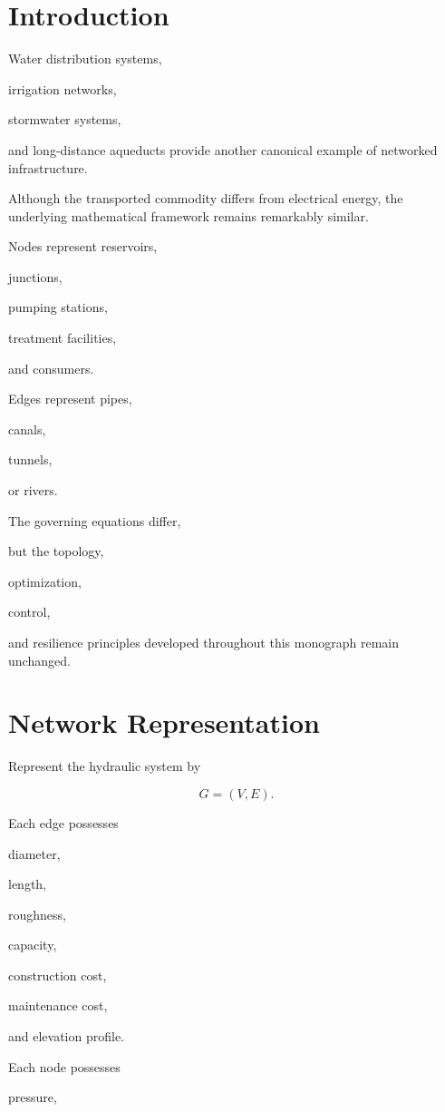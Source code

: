 \documentclass[11pt,fleqn]{book}
\numberwithin{equation}{chapter}
\theoremstyle{plain}
\theoremstyle{definition}
\theoremstyle{remark}
\begin{document}
\section{Introduction}

Water distribution systems,

irrigation networks,

stormwater systems,

and long-distance aqueducts provide another canonical example of
networked infrastructure.

Although the transported commodity differs from electrical energy,
the underlying mathematical framework remains remarkably similar.

Nodes represent reservoirs,

junctions,

pumping stations,

treatment facilities,

and consumers.

Edges represent pipes,

canals,

tunnels,

or rivers.

The governing equations differ,

but the topology,

optimization,

control,

and resilience principles developed throughout this monograph remain
unchanged.


\section{Network Representation}

Represent the hydraulic system by

\[
G=(V,E).
\]

Each edge possesses

diameter,

length,

roughness,

capacity,

construction cost,

maintenance cost,

and elevation profile.

Each node possesses

pressure,
\end{document}
